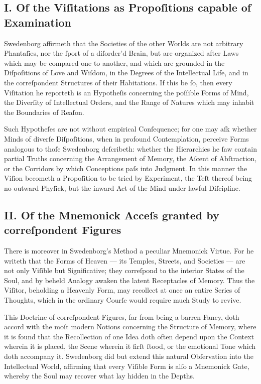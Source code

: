 \documentclass[12pt]{article}
\begin{document}
\subsection*{I. Of the Viſitations as Propoſitions capable of Examination}
Swedenborg affirmeth that the Societies of the other Worlds are not 
arbitrary Phantaſies, nor the ſport of a diſorder’d Brain, but are 
organized after Laws which may be compared one to another, and which 
are grounded in the Diſpoſitions of Love and Wiſdom, in the Degrees of 
the Intellectual Life, and in the correſpondent Structures of their 
Habitations. If this be ſo, then every Viſitation he reporteth is an 
Hypotheſis concerning the poſſible Forms of Mind, the Diverſity of 
Intellectual Orders, and the Range of Natures which may inhabit the 
Boundaries of Reaſon.

Such Hypotheſes are not without empirical Conſequence; for one may 
aſk whether Minds of diverſe Diſpoſitions, when in profound 
Contemplation, perceive Forms analogous to thoſe Swedenborg deſcribeth: 
whether the Hierarchies he ſaw contain partial Truths concerning the 
Arrangement of Memory, the Aſcent of Abſtraction, or the Corridors 
by which Conceptions paſs into Judgment. In this manner the Viſion 
becometh a Propoſition to be tried by Experiment, the Teſt thereof 
being no outward Phyſick, but the inward Act of the Mind under 
lawful Diſcipline.

\subsection*{II. Of the Mnemonick Acceſs granted by correſpondent Figures}
There is moreover in Swedenborg’s Method a peculiar Mnemonick Virtue. 
For he writeth that the Forms of Heaven — its Temples, Streets, and 
Societies — are not only Viſible but Significative; they correſpond 
to the interior States of the Soul, and by beheld Analogy awaken 
the latent Receptacles of Memory. Thus the Viſitor, beholding a 
Heavenly Form, may recollect at once an entire Series of Thoughts, 
which in the ordinary Courſe would require much Study to revive.

This Doctrine of correſpondent Figures, far from being a barren Fancy, 
doth accord with the moſt modern Notions concerning the Structure of 
Memory, where it is found that the Recollection of one Idea doth often 
depend upon the Context wherein it is placed, the Scene wherein it 
firſt ſtood, or the emotional Tone which doth accompany it. Swedenborg 
did but extend this natural Obſervation into the Intellectual World, 
affirming that every Viſible Form is alſo a Mnemonick Gate, whereby the 
Soul may recover what lay hidden in the Depths.
\end{document}
